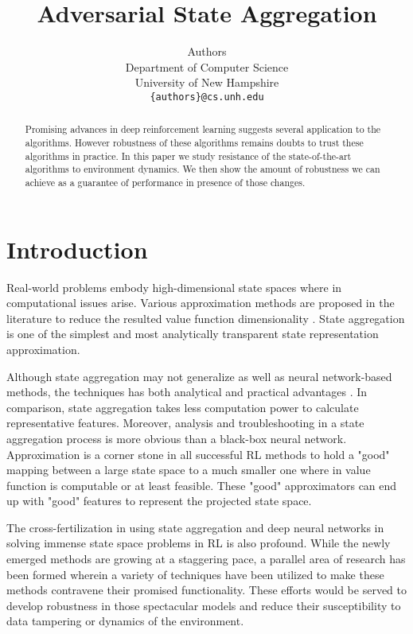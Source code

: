 \documentclass{article}
\title{Adversarial State Aggregation}
\author{%
Authors \\ %
Department of Computer Science\\
University of New Hampshire \\
\texttt{\{authors\}@cs.unh.edu} \\
}
\begin{document}
    \maketitle

    \begin{abstract}
        Promising advances in deep reinforcement learning suggests several application to the algorithms. However
        robustness of these algorithms remains doubts to trust these algorithms in practice. In this paper we study
        resistance of the state-of-the-art algorithms to environment dynamics. We then show the amount of robustness
        we can achieve as a guarantee of performance in presence of those changes.
    \end{abstract}


    \section{Introduction}
    Real-world problems embody high-dimensional state spaces where in computational issues
    arise.
    Various approximation methods are proposed in the literature to reduce the resulted value function
    dimensionality \cite{Sutton1998, Francois-Lavet2018}.
    State aggregation is one of the simplest and most analytically transparent state representation approximation.

    Although state aggregation may not generalize as well as neural network-based methods, the techniques has both
    analytical and practical advantages \cite{Lagoudakis2003}.
    In comparison, state aggregation takes less computation power to calculate representative features.
    Moreover, analysis and troubleshooting in a state aggregation process is more obvious than a black-box neural
    network.
    Approximation is a corner stone in all successful RL methods to hold a "good" mapping between a large state
    space to a much smaller one where in value function is computable or at least feasible.
    These "good" approximators can end up with "good" features to represent the projected state space.

    The cross-fertilization in using state aggregation and deep neural networks in solving immense state
    space problems in RL is also profound.
    While the newly emerged methods are growing at a staggering pace, a parallel area of research has been formed
    wherein a variety of techniques have been utilized to make these methods contravene their promised functionality.
    These efforts would be served to develop robustness in those spectacular models and reduce their
    susceptibility to data tampering or dynamics of the environment.
\end{document}
